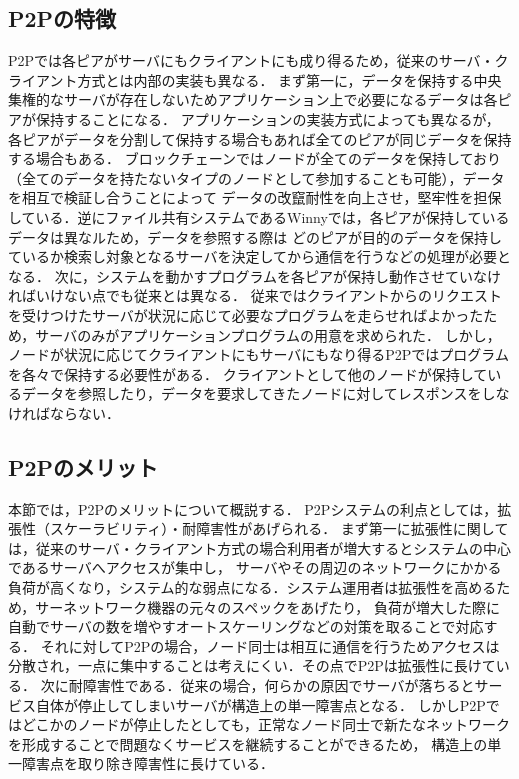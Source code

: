 \subsection{P2Pの特徴}
P2Pでは各ピアがサーバにもクライアントにも成り得るため，従来のサーバ・クライアント方式とは内部の実装も異なる．
まず第一に，データを保持する中央集権的なサーバが存在しないためアプリケーション上で必要になるデータは各ピアが保持することになる．
アプリケーションの実装方式によっても異なるが，各ピアがデータを分割して保持する場合もあれば全てのピアが同じデータを保持する場合もある．
ブロックチェーンではノードが全てのデータを保持しており（全てのデータを持たないタイプのノードとして参加することも可能），データを相互で検証し合うことによって
データの改竄耐性を向上させ，堅牢性を担保している．逆にファイル共有システムであるWinnyでは，各ピアが保持しているデータは異なルため，データを参照する際は
どのピアが目的のデータを保持しているか検索し対象となるサーバを決定してから通信を行うなどの処理が必要となる．
次に，システムを動かすプログラムを各ピアが保持し動作させていなければいけない点でも従来とは異なる．
従来ではクライアントからのリクエストを受けつけたサーバが状況に応じて必要なプログラムを走らせればよかったため，サーバのみがアプリケーションプログラムの用意を求められた．
しかし，ノードが状況に応じてクライアントにもサーバにもなり得るP2Pではプログラムを各々で保持する必要性がある．
クライアントとして他のノードが保持しているデータを参照したり，データを要求してきたノードに対してレスポンスをしなければならない．

\subsection{P2Pのメリット}
本節では，P2Pのメリットについて概説する．
P2Pシステムの利点としては，拡張性（スケーラビリティ）・耐障害性があげられる．
まず第一に拡張性に関しては，従来のサーバ・クライアント方式の場合利用者が増大するとシステムの中心であるサーバへアクセスが集中し，
サーバやその周辺のネットワークにかかる負荷が高くなり，システム的な弱点になる．システム運用者は拡張性を高めるため，サーネットワーク機器の元々のスペックをあげたり，
負荷が増大した際に自動でサーバの数を増やすオートスケーリングなどの対策を取ることで対応する．
それに対してP2Pの場合，ノード同士は相互に通信を行うためアクセスは分散され，一点に集中することは考えにくい．その点でP2Pは拡張性に長けている．
次に耐障害性である．従来の場合，何らかの原因でサーバが落ちるとサービス自体が停止してしまいサーバが構造上の単一障害点となる．
しかしP2Pではどこかのノードが停止したとしても，正常なノード同士で新たなネットワークを形成することで問題なくサービスを継続することができるため，
構造上の単一障害点を取り除き障害性に長けている．

